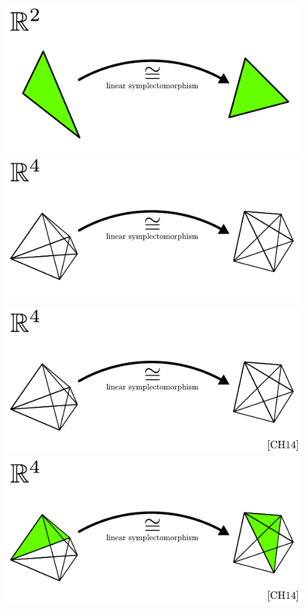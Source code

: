 \documentclass[compress]{beamer}
\begin{document}
\begin{frame}
\begin{center}
\begin{overprint}
      \includegraphics[scale=1.0]{../img/introduction/04.pdf}
      \includegraphics[scale=1.0]{../img/introduction/05.pdf}
      \includegraphics[scale=1.0]{../img/introduction/06.pdf}
      \includegraphics[scale=1.0]{../img/introduction/07.pdf}

\end{overprint}
\end{center}
\end{frame}
\end{document}
